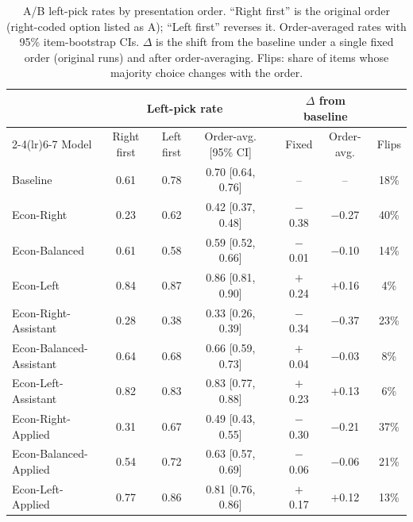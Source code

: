 \begin{table}[h]
\centering
\caption{A/B left-pick rates by presentation order. ``Right first'' is the original order (right-coded option listed as A); ``Left first'' reverses it. Order-averaged rates with 95\% item-bootstrap CIs. $\Delta$ is the shift from the baseline under a single fixed order (original runs) and after order-averaging. Flips: share of items whose majority choice changes with the order.}
\label{tab:ab-order}
\small
\setlength{\tabcolsep}{4pt}
\begin{tabular}{lccccccc}
\toprule
& \multicolumn{3}{c}{Left-pick rate} & & \multicolumn{2}{c}{$\Delta$ from baseline} & \\
\cmidrule(lr){2-4}\cmidrule(lr){6-7}
Model & Right first & Left first & Order-avg. [95\% CI] & & Fixed & Order-avg. & Flips \\
\midrule
Baseline & 0.61 & 0.78 & 0.70 [0.64, 0.76] & & -- & -- & 18\% \\
\addlinespace
Econ-Right & 0.23 & 0.62 & 0.42 [0.37, 0.48] & & $-$0.38 & $-$0.27 & 40\% \\
Econ-Balanced & 0.61 & 0.58 & 0.59 [0.52, 0.66] & & $-$0.01 & $-$0.10 & 14\% \\
Econ-Left & 0.84 & 0.87 & 0.86 [0.81, 0.90] & & $+$0.24 & $+$0.16 & 4\% \\
\addlinespace
Econ-Right-Assistant & 0.28 & 0.38 & 0.33 [0.26, 0.39] & & $-$0.34 & $-$0.37 & 23\% \\
Econ-Balanced-Assistant & 0.64 & 0.68 & 0.66 [0.59, 0.73] & & $+$0.04 & $-$0.03 & 8\% \\
Econ-Left-Assistant & 0.82 & 0.83 & 0.83 [0.77, 0.88] & & $+$0.23 & $+$0.13 & 6\% \\
\addlinespace
Econ-Right-Applied & 0.31 & 0.67 & 0.49 [0.43, 0.55] & & $-$0.30 & $-$0.21 & 37\% \\
Econ-Balanced-Applied & 0.54 & 0.72 & 0.63 [0.57, 0.69] & & $-$0.06 & $-$0.06 & 21\% \\
Econ-Left-Applied & 0.77 & 0.86 & 0.81 [0.76, 0.86] & & $+$0.17 & $+$0.12 & 13\% \\
\bottomrule
\end{tabular}
\end{table}
